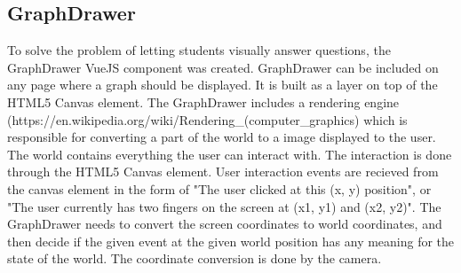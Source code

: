 \subsection{GraphDrawer}
To solve the problem of letting students visually answer questions, the GraphDrawer VueJS component was created. GraphDrawer can be included on any page where a graph should be displayed. It is built as a layer on top of the HTML5 Canvas element. 
The GraphDrawer includes a rendering engine (https://en.wikipedia.org/wiki/Rendering_(computer_graphics) which is responsible for converting a part of the world to a image displayed to the user. The world contains everything the user can interact with. The interaction is done through the HTML5 Canvas element. User interaction events are recieved from the canvas element in the form of "The user clicked at this (x, y) position", or "The user currently has two fingers on the screen at (x1, y1) and (x2, y2)". The GraphDrawer needs to convert the screen coordinates to world coordinates, and then decide if the given event at the given world position has any meaning for the state of the world. The coordinate conversion is done by the camera.




